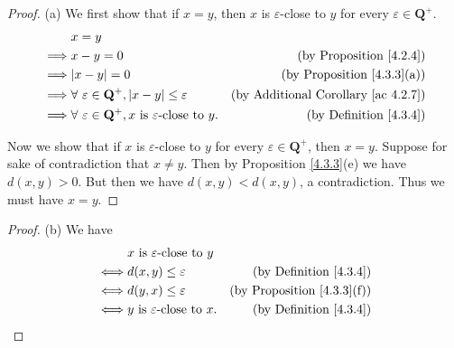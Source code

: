 \begin{proof}{(a)}
    We first show that if \(x = y\), then \(x\) is \(\varepsilon\)-close to \(y\) for every \(\varepsilon \in \mathbf{Q}^+\).
    \begin{align*}
                 & x = y                                                                                                                              \\
        \implies & x - y = 0                                                                        & \text{(by Proposition \ref{4.2.4})}             \\
        \implies & \abs*{x - y} = 0                                                                 & \text{(by Proposition \ref{4.3.3}(a))}          \\
        \implies & \forall\ \varepsilon \in \mathbf{Q}^+, \abs*{x - y} \leq \varepsilon             & \text{(by Additional Corollary \ref{ac 4.2.7})} \\
        \implies & \forall\ \varepsilon \in \mathbf{Q}^+, x \text{ is \(\varepsilon\)-close to } y. & \text{(by Definition \ref{4.3.4})}
    \end{align*}

    Now we show that if \(x\) is \(\varepsilon\)-close to \(y\) for every \(\varepsilon \in \mathbf{Q}^+\), then \(x = y\).
    Suppose for sake of contradiction that \(x \neq y\).
    Then by Proposition \ref{4.3.3}(e) we have \(d(x, y) > 0\).
    But then we have \(d(x, y) < d(x, y)\), a contradiction.
    Thus we must have \(x = y\).
\end{proof}

\begin{proof}{(b)}
    We have
    \begin{align*}
             & x \text{ is \(\varepsilon\)-close to } y                                           \\
        \iff & d(x, y) \leq \varepsilon                  & \text{(by Definition \ref{4.3.4})}     \\
        \iff & d(y, x) \leq \varepsilon                  & \text{(by Proposition \ref{4.3.3}(f))} \\
        \iff & y \text{ is \(\varepsilon\)-close to } x. & \text{(by Definition \ref{4.3.4})}
    \end{align*}
\end{proof}

